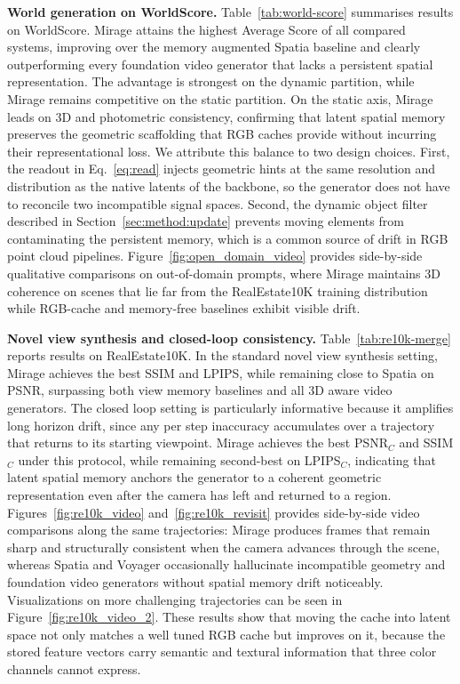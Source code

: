 \documentclass{llmxive}
\providecommand{\method}{Mirage\xspace}
\providecommand{\boldstart}[1]{\vspace{0.1in}\noindent\textbf{#1}}
\begin{document}
\boldstart{World generation on WorldScore.}
Table~\ref{tab:world-score} summarises results on WorldScore. \method{} attains the highest Average Score of all compared systems, improving over the memory augmented Spatia baseline and clearly outperforming every foundation video generator that lacks a persistent spatial representation. The advantage is strongest on the dynamic partition, while \method{} remains competitive on the static partition. On the static axis, \method{} leads on 3D and photometric consistency, confirming that latent spatial memory preserves the geometric scaffolding that RGB caches provide without incurring their representational loss. We attribute this balance to two design choices. First, the readout in Eq.~\ref{eq:read} injects geometric hints at the same resolution and distribution as the native latents of the backbone, so the generator does not have to reconcile two incompatible signal spaces. Second, the dynamic object filter described in Section~\ref{sec:method:update} prevents moving elements from contaminating the persistent memory, which is a common source of drift in RGB point cloud pipelines. Figure~\ref{fig:open_domain_video} provides side-by-side qualitative comparisons on out-of-domain prompts, where \method{} maintains 3D coherence on scenes that lie far from the RealEstate10K training distribution while RGB-cache and memory-free baselines exhibit visible drift.

\boldstart{Novel view synthesis and closed-loop consistency.}
Table~\ref{tab:re10k-merge} reports results on RealEstate10K. In the standard novel view synthesis setting, \method{} achieves the best SSIM and LPIPS, while remaining close to Spatia on PSNR, surpassing both view memory baselines and all 3D aware video generators. The closed loop setting is particularly informative because it amplifies long horizon drift, since any per step inaccuracy accumulates over a trajectory that returns to its starting viewpoint. \method{} achieves the best PSNR$_C$ and SSIM$_C$ under this protocol, while remaining second-best on LPIPS$_C$, indicating that latent spatial memory anchors the generator to a coherent geometric representation even after the camera has left and returned to a region. Figures~\ref{fig:re10k_video} and~\ref{fig:re10k_revisit} provides side-by-side video comparisons along the same trajectories: \method{} produces frames that remain sharp and structurally consistent when the camera advances through the scene, whereas Spatia and Voyager occasionally hallucinate incompatible geometry and foundation video generators without spatial memory drift noticeably. Visualizations on more challenging trajectories can be seen in Figure~\ref{fig:re10k_video_2}. These results show that moving the cache into latent space not only matches a well tuned RGB cache but improves on it, because the stored feature vectors carry semantic and textural information that three color channels cannot express.
\end{document}
